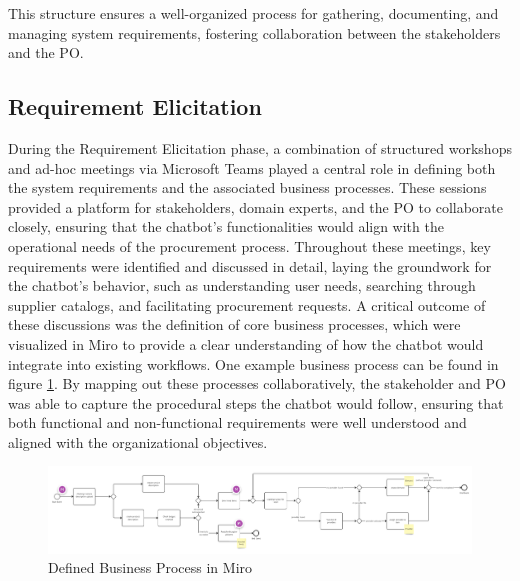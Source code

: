 This structure ensures a well-organized process for gathering, documenting, and managing system requirements, fostering
collaboration between the stakeholders and the \acs{PO}.

\subsection{Requirement Elicitation}\label{subsec:requirement-elicitation}

During the Requirement Elicitation phase, a combination of structured workshops and ad-hoc meetings via Microsoft Teams
played a central role in defining both the system requirements and the associated business processes. These sessions
provided a platform for stakeholders, domain experts, and the \acs{PO} to collaborate closely, ensuring that the
chatbot’s functionalities would align with the operational needs of the procurement process. Throughout these meetings,
key requirements were identified and discussed in detail, laying the groundwork for the chatbot’s behavior, such as
understanding user needs, searching through supplier catalogs, and facilitating procurement requests. A critical outcome
of these discussions was the definition of core business processes, which were visualized in Miro to provide a clear
understanding of how the chatbot would integrate into existing workflows. One example business process can be found in
figure \ref{fig:DefinedBusinessProcessinMiro}. By mapping out these processes collaboratively, the stakeholder and
\acs{PO} was able to capture the procedural steps the chatbot would follow, ensuring that both functional and
non-functional requirements were well understood and aligned with the organizational objectives.

\begin{figure}[H]
    \centering
    \caption[Defined Business Process in Miro]{Defined Business Process in Miro \footnotemark}
    \label{fig:DefinedBusinessProcessinMiro}
    \includegraphics[width=1\textwidth]{abbildungen/RE/Miro/Miro_Business-Process}
\end{figure}

